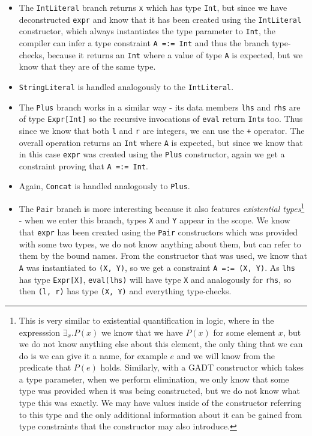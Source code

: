 \begin{itemize}
  \item The \texttt{IntLiteral} branch returns \texttt{x} which has type \texttt{Int}, but since we have deconstructed \texttt{expr} and know that it has been created using the \texttt{IntLiteral} constructor, which always instantiates the type parameter to \texttt{Int}, the compiler can infer a type constraint \texttt{A =:= Int} and thus the branch type-checks, because it returns an \texttt{Int} where a value of type \texttt{A} is expected, but we know that they are of the same type.
  
  \item \texttt{StringLiteral} is handled analogously to the \texttt{IntLiteral}.
  
  \item The \texttt{Plus} branch works in a similar way - its data members \texttt{lhs} and \texttt{rhs} are of type \texttt{Expr[Int]} so the recursive invocations of \texttt{eval} return \texttt{Int}s too. Thus since we know that both \texttt{l} and \texttt{r} are integers, we can use the \texttt{+} operator. The overall operation returns an \texttt{Int} where \texttt{A} is expected, but since we know that in this case \texttt{expr} was created using the \texttt{Plus} constructor, again we get a constraint proving that \texttt{A =:= Int}.
  
  \item Again, \texttt{Concat} is handled analogously to \texttt{Plus}.
  
  \item The \texttt{Pair} branch is more interesting because it also features \textit{existential types}\footnote{This is very similar to existential quantification in logic, where in the expresssion $\exists_x. P(x)$ we know that we have $P(x)$ for some element $x$, but we do not know anything else about this element, the only thing that we can do is we can give it a name, for example $e$ and we will know from the predicate that $P(e)$ holds. Similarly, with a GADT constructor which takes a type parameter, when we perform elimination, we only know that some type was provided when it was being constructed, but we do not know what type this was exactly. We may have values inside of the constructor referring to this type and the only additional information about it can be gained from type constraints that the constructor may also introduce.}\cite{exist1, existjavawildcards, exist2infer} - when we enter this branch, types \texttt{X} and \texttt{Y} appear in the scope. We know that \texttt{expr} has been created using the \texttt{Pair} constructors which was provided with some two types, we do not know anything about them, but can refer to them by the bound names. From the constructor that was used, we know that \texttt{A} was instantiated to \texttt{(X, Y)}, so we get a constraint \texttt{A =:= (X, Y)}. As \texttt{lhs} has type \texttt{Expr[X]}, \texttt{eval(lhs)} will have type \texttt{X} and analogously for \texttt{rhs}, so then \texttt{(l, r)} has type \texttt{(X, Y)} and everything type-checks.
\end{itemize}

